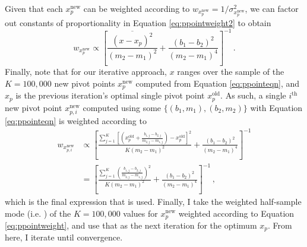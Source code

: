 Given that each $x_p^\text{new}$ can be weighted according to $w_{x_p^\text{new}}=1/\sigma_{x_p^\text{new}}^2$, we can factor out constants of proportionality in Equation \eqref{eq:ppointweight2} to obtain
\begin{equation}
w_{x_p^\text{new}} \propto \left[\frac{\overline{(x-x_p)^2}}{(m_2-m_1)^2} + \frac{(b_1-b_2)^2}{(m_2-m_1)^4}\right]^{-1}\,.
\end{equation}
Finally, note that for our iterative approach, $x$ ranges over the sample of the $K=100,000$ new pivot points $x_p^\text{new}$ computed from Equation \eqref{eq:ppointeqn}, and $x_p$ is the previous iteration's optimal single pivot point $x_p^\text{old}$. As such, a single $i^\text{th}$ new pivot point $x_{p,i}^\text{new}$ computed using some $\{(b_1,m_1),(b_2,m_2)\}$ with Equation \eqref{eq:ppointeqn} is weighted according to 
\begin{align}
\label{eq:ppointweight}
w_{x_{p,i}^\text{new}} &\propto\displaystyle \left[\frac{\sum_{j=1}^{K}\left[\left(x_p^\text{old}+ \frac{b_{1,j}-b_{2,j}}{m_{2,j}-m_{1,j}}\right)-x_p^\text{old}\right]^2}{K(m_2-m_1)^2} + \frac{(b_1-b_2)^2}{(m_2-m_1)^4}\right]^{-1} \nonumber \\
&=\displaystyle\left[\frac{\sum_{j=1}^{K}\left(\frac{b_{1,j}-b_{2,j}}{m_{2,j}-m_{1,j}}\right)^2}{K(m_2-m_1)^2} + \frac{(b_1-b_2)^2}{(m_2-m_1)^4}\right]^{-1}\,,
\end{align}
which is the final expression that is used. Finally, I take the weighted half-sample mode (i.e. \textcite{bickel2005fast}) of the $K=100,000$ values for $x_p^\text{new}$ weighted according to Equation \eqref{eq:ppointweight}, and use that as the next iteration for the optimum $x_p$. From here, I iterate until convergence.

